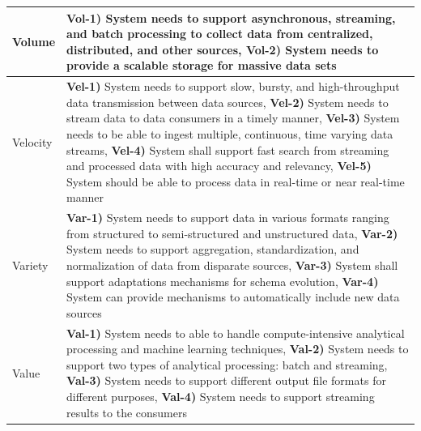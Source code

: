 \documentclass[conference]{IEEEtran}
\begin{document}
\begin{table}[h]
    \centering
    \renewcommand*{\arraystretch}{1.8}
    \begin{tabular}{|m{1.2cm}|m{16cm}|}

        \hline

        Volume &

        \textbf{Vol-1)} System needs to support asynchronous, streaming, and batch processing to collect data from centralized, distributed, and other sources, \textbf{Vol-2)} System needs to provide a scalable storage for massive data sets 
        \\
        \hline
        Velocity & 
        
        \textbf{Vel-1)} System needs to support slow, bursty, and high-throughput data transmission between data sources, \textbf{Vel-2)} System needs to stream data to data consumers in a timely manner, \textbf{Vel-3)} System needs to be able to ingest multiple, continuous, time varying data streams, \textbf{Vel-4)} System shall support fast search from streaming and processed data with high accuracy and relevancy, \textbf{Vel-5)} System should be able to process data in real-time or near real-time manner 
        \\ 

        \hline

        Variety & 

        \textbf{Var-1)} System needs to support data in various formats ranging from structured to semi-structured and unstructured data, \textbf{Var-2)} System needs to support aggregation, standardization, and normalization of data from disparate sources, \textbf{Var-3)} System shall support adaptations mechanisms for schema evolution, \textbf{Var-4)} System can provide mechanisms to automatically include new data sources 
        \\

        \hline

        Value & 
        
        \textbf{Val-1)} System needs to able to handle compute-intensive analytical processing and machine learning techniques, \textbf{Val-2)} System needs to support two types of analytical processing: batch and streaming, \textbf{Val-3)} System needs to support different output file formats for different purposes, \textbf{Val-4)} System needs to support streaming results to the consumers 
        \\

        \hline


\end{tabular}
\end{table}
\end{document}
